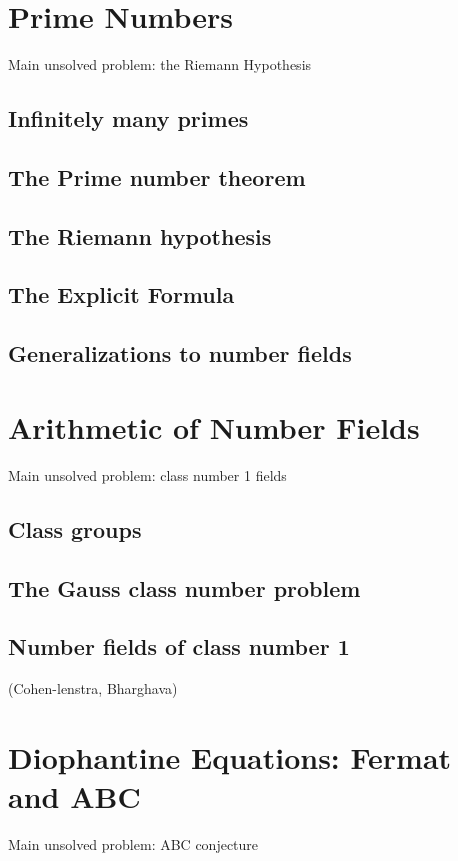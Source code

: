 \documentclass{book}
\begin{document}
\chapter{Prime Numbers}

Main unsolved problem: the Riemann Hypothesis



\section{Infinitely many primes}
\section{The Prime number theorem}
\section{The Riemann hypothesis}
\section{The Explicit Formula}
\section{Generalizations to number fields}


\chapter{Arithmetic of Number Fields}
Main unsolved problem: class number 1 fields

\section{Class groups}
\section{The Gauss class number problem}
\section{Number fields of class number 1}
 (Cohen-lenstra, Bharghava)



\chapter{Diophantine Equations: Fermat and ABC}
Main unsolved problem: ABC conjecture
\end{document}
